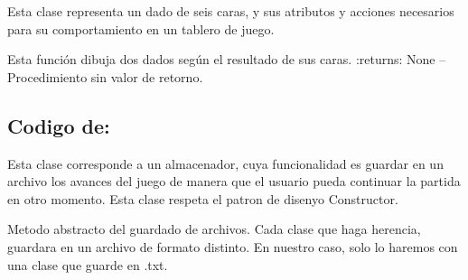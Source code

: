 \documentclass[letterpaper,10pt,english]{sphinxmanual}
\begin{document}
\begin{fulllineitems}
\label{\detokenize{codigo:dado.VistaDado}}
Esta clase representa un dado de seis caras, y sus atributos y acciones necesarios 
para su comportamiento en un tablero de juego.

\begin{fulllineitems}
\label{\detokenize{codigo:dado.VistaDado.dibujar}}
Esta función dibuja dos dados según el resultado de sus caras.
:returns:  None -- Procedimiento sin valor de retorno.

\end{fulllineitems}


\end{fulllineitems}



\subsection{Codigo de: }
\label{\detokenize{codigo:module-almacenador}}\label{\detokenize{codigo:codigo-de-almacenador}}

\begin{fulllineitems}
\label{\detokenize{codigo:almacenador.Almacenador}}
Esta clase corresponde a un almacenador, cuya funcionalidad es guardar en un archivo los avances del juego de manera
que el usuario pueda continuar la partida en otro momento. Esta clase respeta el patron de disenyo Constructor.

\begin{fulllineitems}
\label{\detokenize{codigo:almacenador.Almacenador.guardar}}
Metodo abstracto del guardado de archivos. Cada clase que haga herencia, guardara en un archivo de formato distinto.
En nuestro caso, solo lo haremos con una clase que guarde en .txt.

\end{fulllineitems}


\end{fulllineitems}
\end{document}

